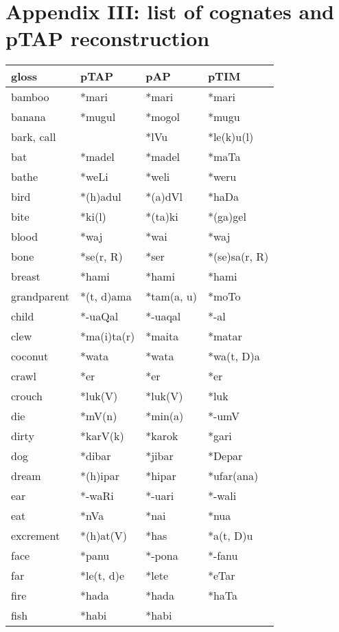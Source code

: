 \section[Appendix III: list of cognates and pTAP reconstruction]{Appendix III: list of cognates and pTAP reconstruction}
\hypertarget{RefHeading65433871885726}{}\begin{center}
\tablehead{}
\begin{supertabular}{m{0.9011598in}m{0.81295985in}m{0.81295985in}m{0.83515984in}}
\hline
\textbf{gloss} &
\textbf{pTAP} &
\textbf{pAP} &
\textbf{pTIM}\\\hline
bamboo &
*mari &
*mari &
*mari\\
banana &
*mugul &
*mogol &
*mugu\\
bark, call &
 &
*lVu &
*le(k)u(l)\\
bat &
*madel &
*madel &
*maTa\\
bathe &
*weLi &
*weli &
*weru\\
bird &
*(h)adul &
*(a)dVl &
*haDa\\
bite &
*ki(l) &
*(ta)ki &
*(ga)gel\\
blood &
*waj &
*wai &
*waj\\
bone &
*se(r, R) &
*ser &
*(se)sa(r, R)\\
breast &
*hami &
*hami &
*hami\\
grandparent &
*(t, d)ama &
*tam(a, u) &
*moTo\\
child &
*-uaQal &
*-uaqal &
*-al\\
clew &
*ma(i)ta(r) &
*maita &
*matar\\
coconut &
*wata &
*wata &
*wa(t, D)a\\
crawl &
*er &
*er &
*er\\
crouch &
*luk(V) &
*luk(V) &
*luk\\
die &
*mV(n) &
*min(a) &
*-umV\\
dirty &
*karV(k) &
*karok &
*gari\\
dog &
*dibar &
*jibar &
*Depar\\
dream &
*(h)ipar &
*hipar &
*ufar(ana)\\
ear &
*-waRi &
*-uari &
*-wali\\
eat &
*nVa &
*nai &
*nua\\
excrement &
*(h)at(V) &
*has &
*a(t, D)u\\
face &
*panu &
*-pona &
*-fanu\\
far &
*le(t, d)e &
*lete &
*eTar\\
fire &
*hada &
*hada &
*haTa\\
fish &
*habi &
*habi &

\end{supertabular}
\end{center}
